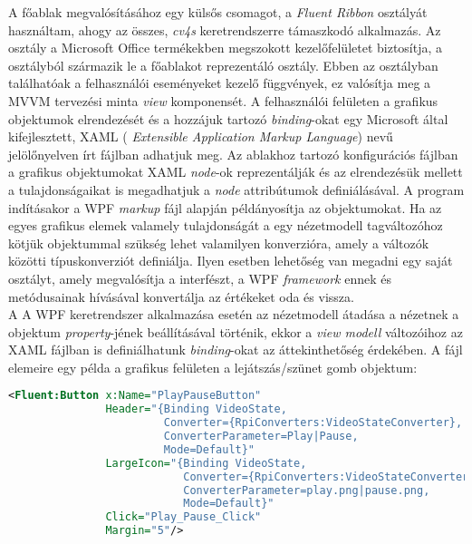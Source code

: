 A főablak megvalósításához egy külsős csomagot, a \emph{Fluent Ribbon}  osztályát használtam, ahogy az összes, \emph{cv4s} keretrendszerre támaszkodó alkalmazás. Az osztály a Microsoft Office termékekben megszokott kezelőfelületet biztosítja, a  osztályból származik le a főablakot reprezentáló osztály. Ebben az osztályban találhatóak a felhasználói eseményeket kezelő függvények, ez valósítja meg a MVVM tervezési minta \emph{view} komponensét. A felhasználói felületen a grafikus objektumok elrendezését és a hozzájuk tartozó \emph{binding}-okat egy Microsoft által kifejlesztett, XAML (\emph{ Extensible Application Markup Language}) nevű jelölőnyelven írt fájlban adhatjuk meg. Az ablakhoz tartozó konfigurációs fájlban a grafikus objektumokat XAML \emph{node}-ok reprezentálják és  az elrendezésük mellett a tulajdonságaikat is megadhatjuk a \emph{node} attribútumok definiálásával. A program indításakor a WPF \emph{markup} fájl alapján példányosítja az objektumokat. Ha az egyes grafikus elemek valamely tulajdonságát a egy nézetmodell tagváltozóhoz kötjük  objektummal szükség lehet valamilyen konverzióra, amely a változók közötti típuskonverziót definiálja. Ilyen esetben lehetőség van megadni egy saját osztályt, amely megvalósítja a  interfészt, a WPF \emph{framework} ennek  és  metódusainak hívásával konvertálja az értékeket oda és vissza. \\
A A WPF keretrendszer alkalmazása esetén az nézetmodell átadása a nézetnek a  objektum  \emph{property}-jének beállításával történik, ekkor a \emph{view modell} változóihoz az XAML fájlban is definiálhatunk \emph{binding}-okat az áttekinthetőség érdekében. A fájl elemeire egy példa a grafikus felületen a lejátszás/szünet gomb objektum:

\begin{mdframed}[backgroundcolor=gray!20]
\begin{small}
\begin{scriptsize}
\begin{lstlisting}[language=XML]
<Fluent:Button x:Name="PlayPauseButton" 
			   Header="{Binding VideoState, 
			            Converter={RpiConverters:VideoStateConverter}, 
			            ConverterParameter=Play|Pause, 
			            Mode=Default}" 
               LargeIcon="{Binding VideoState,
               			   Converter={RpiConverters:VideoStateConverter}, 
               			   ConverterParameter=play.png|pause.png,
               			   Mode=Default}" 
               Click="Play_Pause_Click" 
               Margin="5"/>
\end{lstlisting}
\end{scriptsize}
\end{small}
\end{mdframed}


